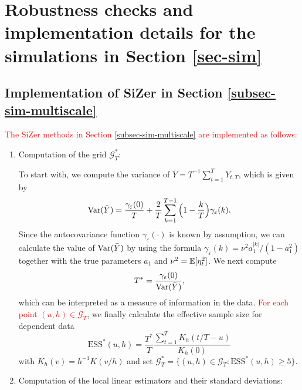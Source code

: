 
\section{Robustness checks and implementation details for the simulations in Section \ref{sec-sim}}\label{sec-supp-sim}


\subsection*{Implementation of SiZer in Section \ref{subsec-sim-multiscale}}


\textcolor{red}{The SiZer methods in Section \ref{subsec-sim-multiscale} are implemented as follows:}
\begin{enumerate}[leftmargin=0.7cm,label=(\alph*)]

\item Computation of the grid $\mathcal{G}_T^*$:

To start with, we compute the variance of $\bar{Y} = T^{-1} \sum_{t=1}^T Y_{t,T}$, which is given by
\[ \textnormal{Var}(\bar{Y}) = \frac{\gamma_\varepsilon(0)}{T} + \frac{2}{T} \sum_{k = 1}^{T-1} \Big(1 - \frac{k}{T}\Big)\gamma_\varepsilon(k). \]
Since the autocovariance function $\gamma_{\varepsilon}(\cdot)$ is known by assumption, we can calculate the value of $\textnormal{Var}(\bar{Y})$ by using the formula $\gamma_\varepsilon(k) = \nu^2 a_1^{|k|} / (1 - a_1^2)$ together with the true para\-meters $a_1$ and $\nu^2 = \mathbb{E}[\eta_t^2]$. We next compute 
\[ T^* = \frac{\gamma_\varepsilon(0)}{\textnormal{Var}(\bar{Y})}, \]
which can be interpreted as a measure of information in the data. \textcolor{red}{For each point $(u,h) \in \mathcal{G}_T$}, we finally calculate the effective sample size for dependent data 
\[ \text{ESS}^*(u, h) = \frac{T^*}{T} \frac{\sum_{t=1}^T K_h(t/T - u)}{K_h(0)} \]
with $K_h(v) = h^{-1} K(v/h)$ and set $\mathcal{G}_T^* = \{ (u,h) \in \mathcal{G}_T: \text{ESS}^*(u, h) \ge 5 \}$. 

\item Computation of the local linear estimators and their standard deviations: 


\end{enumerate}
